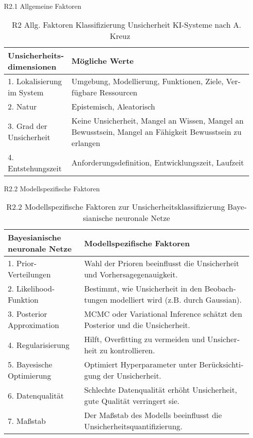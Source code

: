 \begin{otherlanguage}{ngerman}
\newline
R2.1 Allgemeine Faktoren

\begin{table}[!htpb]
  \centering
  \footnotesize
  \begin{tabularx}{\textwidth}{|l|X|}
    \hline
    \textbf{Unsicherheitsdimensionen} & \textbf{Mögliche Werte} \\
    \hline
    1. Lokalisierung im System & Umgebung, Modellierung, Funktionen, Ziele, Verfügbare Ressourcen \\
    \hline
    2. Natur & Epistemisch, Aleatorisch \\
    \hline
    3. Grad der Unsicherheit & Keine Unsicherheit, Mangel an Wissen, Mangel an Bewusstsein, Mangel an Fähigkeit Bewusstsein zu erlangen \\
    \hline
    4. Entstehungszeit & Anforderungsdefinition, Entwicklungszeit, Laufzeit \\
    \hline
  \end{tabularx}
  \caption{R2 Allg. Faktoren Klassifizierung Unsicherheit KI-Systeme nach A. Kreuz ~\nocite{AndreasKreutz2022} ~\nocite{AndreasKreutz2022b}}
  \label{tab:chapter6r21}
\end{table}

\newline
R2.2 Modellspezifische Faktoren

\begin{table}[!htpb]
  \centering
  \footnotesize
  \begin{tabularx}{\textwidth}{|l|X|}
    \hline
    \textbf{\gls{Bayesianische neuronale Netze}} & \textbf{Modellspezifische Faktoren} \\
    \hline
    1. Prior-Verteilungen & Wahl der Prioren beeinflusst die Unsicherheit und Vorhersagegenauigkeit. \\
    \hline
    2. Likelihood-Funktion & Bestimmt, wie Unsicherheit in den Beobachtungen modelliert wird (z.B. durch Gaussian). \\
    \hline
    3. Posterior Approximation & MCMC oder Variational Inference schätzt den Posterior und die Unsicherheit. \\
    \hline
    4. Regularisierung & Hilft, Overfitting zu vermeiden und Unsicherheit zu kontrollieren. \\
    \hline
    5. Bayesische Optimierung & Optimiert Hyperparameter unter Berücksichtigung der Unsicherheit. \\
    \hline
    6. Datenqualität & Schlechte Datenqualität erhöht Unsicherheit, gute Qualität verringert sie. \\
    \hline
    7. Maßstab & Der Maßstab des Modells beeinflusst die Unsicherheitsquantifizierung. \\
    \hline
  \end{tabularx}
  \caption{R2.2 Modellspezifische Faktoren zur Unsicherheitsklassifizierung \gls{Bayesianische neuronale Netze}}\label{tab:chapter6r22}
\end{table}


\end{otherlanguage}
